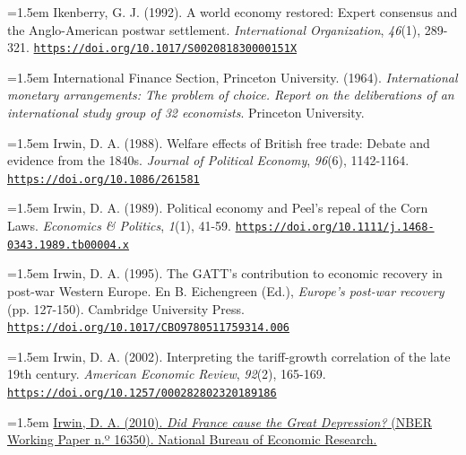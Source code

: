 \documentclass[10pt,a4paper]{article}
\begin{document}
{\sloppy\noindent\hangindent=1.5em Ikenberry, G. J. (1992). A world economy restored: Expert consensus and the Anglo-American postwar settlement. \textit{International Organization}, \textit{46}(1), 289-321. \href{https://doi.org/10.1017/S002081830000151X}{\nolinkurl{https://doi.org/10.1017/S002081830000151X}}\par}

{\sloppy\noindent\hangindent=1.5em International Finance Section, Princeton University. (1964). \textit{International monetary arrangements: The problem of choice. Report on the deliberations of an international study group of 32 economists}. Princeton University.\par}

{\sloppy\noindent\hangindent=1.5em Irwin, D. A. (1988). Welfare effects of British free trade: Debate and evidence from the 1840s. \textit{Journal of Political Economy}, \textit{96}(6), 1142-1164. \href{https://doi.org/10.1086/261581}{\nolinkurl{https://doi.org/10.1086/261581}}\par}

{\sloppy\noindent\hangindent=1.5em Irwin, D. A. (1989). Political economy and Peel's repeal of the Corn Laws. \textit{Economics \& Politics}, \textit{1}(1), 41-59. \href{https://doi.org/10.1111/j.1468-0343.1989.tb00004.x}{\nolinkurl{https://doi.org/10.1111/j.1468-0343.1989.tb00004.x}}\par}

{\sloppy\noindent\hangindent=1.5em Irwin, D. A. (1995). The GATT's contribution to economic recovery in post-war Western Europe. En B. Eichengreen (Ed.), \textit{Europe's post-war recovery} (pp. 127-150). Cambridge University Press. \href{https://doi.org/10.1017/CBO9780511759314.006}{\nolinkurl{https://doi.org/10.1017/CBO9780511759314.006}}\par}

{\sloppy\noindent\hangindent=1.5em Irwin, D. A. (2002). Interpreting the tariff-growth correlation of the late 19th century. \textit{American Economic Review}, \textit{92}(2), 165-169. \href{https://doi.org/10.1257/000282802320189186}{\nolinkurl{https://doi.org/10.1257/000282802320189186}}\par}

{\sloppy\noindent\hangindent=1.5em \href{https://www.nber.org/papers/w16350}{Irwin, D. A. (2010). \textit{Did France cause the Great Depression?} (NBER Working Paper n.º 16350). National Bureau of Economic Research.}\par}
\end{document}
